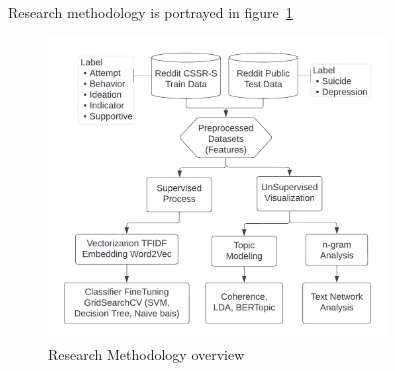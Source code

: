 \documentclass[sn-mathphys,Numbered]{sn-jnl}%
\theoremstyle{thmstyleone}%
\theoremstyle{thmstyletwo}%
\theoremstyle{thmstylethree}%
\begin{document}

Research methodology is portrayed in figure~\ref{fig:res_diagram} 
\begin{figure}[h!]
\centering
\includegraphics[width=0.8\textwidth]{res_diagram.jpeg}
\caption{Research Methodology overview}
\label{fig:res_diagram}
\end{figure}
\end{document}

